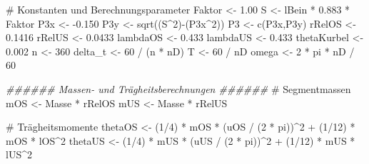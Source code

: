 \documentclass[
  letterpaper,
  DIV=11]{scrartcl}
\newenvironment{Shaded}{\begin{snugshade}}{\end{snugshade}}
\newcommand{\CommentTok}[1]{\textcolor[rgb]{0.37,0.37,0.37}{#1}}
\newcommand{\DecValTok}[1]{\textcolor[rgb]{0.68,0.00,0.00}{#1}}
\newcommand{\DocumentationTok}[1]{\textcolor[rgb]{0.37,0.37,0.37}{\textit{#1}}}
\newcommand{\FloatTok}[1]{\textcolor[rgb]{0.68,0.00,0.00}{#1}}
\newcommand{\FunctionTok}[1]{\textcolor[rgb]{0.28,0.35,0.67}{#1}}
\newcommand{\NormalTok}[1]{\textcolor[rgb]{0.00,0.23,0.31}{#1}}
\newcommand{\OtherTok}[1]{\textcolor[rgb]{0.00,0.23,0.31}{#1}}
\newcommand{\SpecialCharTok}[1]{\textcolor[rgb]{0.37,0.37,0.37}{#1}}
\begin{document}
\begin{Shaded}
\begin{Highlighting}[]
\CommentTok{\# Konstanten und Berechnungsparameter}
\NormalTok{Faktor }\OtherTok{\textless{}{-}} \FloatTok{1.00}
\NormalTok{S }\OtherTok{\textless{}{-}}\NormalTok{ lBein }\SpecialCharTok{*} \FloatTok{0.883} \SpecialCharTok{*}\NormalTok{ Faktor}
\NormalTok{P3x }\OtherTok{\textless{}{-}} \SpecialCharTok{{-}}\FloatTok{0.150}
\NormalTok{P3y }\OtherTok{\textless{}{-}} \FunctionTok{sqrt}\NormalTok{((S}\SpecialCharTok{\^{}}\DecValTok{2}\NormalTok{)}\SpecialCharTok{{-}}\NormalTok{(P3x}\SpecialCharTok{\^{}}\DecValTok{2}\NormalTok{))}
\NormalTok{P3 }\OtherTok{\textless{}{-}} \FunctionTok{c}\NormalTok{(P3x,P3y)}
\NormalTok{rRelOS }\OtherTok{\textless{}{-}} \FloatTok{0.1416}
\NormalTok{rRelUS }\OtherTok{\textless{}{-}} \FloatTok{0.0433}
\NormalTok{lambdaOS }\OtherTok{\textless{}{-}} \FloatTok{0.433}
\NormalTok{lambdaUS }\OtherTok{\textless{}{-}} \FloatTok{0.433}
\NormalTok{thetaKurbel }\OtherTok{\textless{}{-}} \FloatTok{0.002}
\NormalTok{n }\OtherTok{\textless{}{-}} \DecValTok{360}
\NormalTok{delta\_t }\OtherTok{\textless{}{-}} \DecValTok{60} \SpecialCharTok{/}\NormalTok{ (n }\SpecialCharTok{*}\NormalTok{ nD)}
\NormalTok{T }\OtherTok{\textless{}{-}} \DecValTok{60} \SpecialCharTok{/}\NormalTok{ nD}
\NormalTok{omega }\OtherTok{\textless{}{-}} \DecValTok{2} \SpecialCharTok{*}\NormalTok{ pi }\SpecialCharTok{*}\NormalTok{ nD }\SpecialCharTok{/} \DecValTok{60}

\DocumentationTok{\#\#\#\#\#\# Massen{-} und Trägheitsberechnungen \#\#\#\#\#\#}
\CommentTok{\# Segmentmassen}
\NormalTok{mOS }\OtherTok{\textless{}{-}}\NormalTok{ Masse }\SpecialCharTok{*}\NormalTok{ rRelOS }
\NormalTok{mUS }\OtherTok{\textless{}{-}}\NormalTok{ Masse }\SpecialCharTok{*}\NormalTok{ rRelUS }

\CommentTok{\# Trägheitsmomente}
\NormalTok{thetaOS }\OtherTok{\textless{}{-}}\NormalTok{ (}\DecValTok{1}\SpecialCharTok{/}\DecValTok{4}\NormalTok{) }\SpecialCharTok{*}\NormalTok{ mOS }\SpecialCharTok{*}\NormalTok{ (uOS }\SpecialCharTok{/}\NormalTok{ (}\DecValTok{2} \SpecialCharTok{*}\NormalTok{ pi))}\SpecialCharTok{\^{}}\DecValTok{2} \SpecialCharTok{+}\NormalTok{ (}\DecValTok{1}\SpecialCharTok{/}\DecValTok{12}\NormalTok{) }\SpecialCharTok{*}\NormalTok{ mOS }\SpecialCharTok{*}\NormalTok{ lOS}\SpecialCharTok{\^{}}\DecValTok{2}
\NormalTok{thetaUS }\OtherTok{\textless{}{-}}\NormalTok{ (}\DecValTok{1}\SpecialCharTok{/}\DecValTok{4}\NormalTok{) }\SpecialCharTok{*}\NormalTok{ mUS }\SpecialCharTok{*}\NormalTok{ (uUS }\SpecialCharTok{/}\NormalTok{ (}\DecValTok{2} \SpecialCharTok{*}\NormalTok{ pi))}\SpecialCharTok{\^{}}\DecValTok{2} \SpecialCharTok{+}\NormalTok{ (}\DecValTok{1}\SpecialCharTok{/}\DecValTok{12}\NormalTok{) }\SpecialCharTok{*}\NormalTok{ mUS }\SpecialCharTok{*}\NormalTok{ lUS}\SpecialCharTok{\^{}}\DecValTok{2}


\end{Highlighting}
\end{Shaded}
\end{document}
